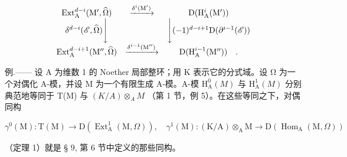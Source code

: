 \[
\begin{array}{c c c} \operatorname{Ext} _ {\mathrm{A}} ^ {d - i} (\mathrm{M} ^ {\prime}, \widehat {\Omega}) & \xrightarrow {\delta^ {i} (\mathrm{M} ^ {\prime})} & \mathrm{D} (\mathrm{H} _ {\mathrm{A}} ^ {i} (\mathrm{M} ^ {\prime})) \\ \delta^ {d - i} (\mathscr {E}, \widehat {\Omega}) \Bigg \downarrow & & \Bigg \downarrow (- 1) ^ {d - i + 1} \mathrm{D} (\partial^ {i - 1} (\mathscr {E})) \\ \operatorname{Ext} _ {\mathrm{A}} ^ {d - i + 1} (\mathrm{M} ^ {\prime \prime}, \widehat {\Omega}) & \xrightarrow {\delta^ {i - 1} (\mathrm{M} ^ {\prime \prime})} & \mathrm{D} (\mathrm{H} _ {\mathrm{A}} ^ {i - 1} (\mathrm{M} ^ {\prime \prime})) \quad . \end{array}
\]

例.—— 设 A 为维数 1 的 Noether 局部整环；用 K 表示它的分式域。设 Ω 为一个对偶化 A-模，并设 M 为一个有限生成 A-模。A-模 \(\mathrm{H}_{\mathrm{A}}^{0}(M)\) 与 \(\mathrm{H}_{\mathrm{A}}^{1}(M)\) 分别典范地等同于 T(M) 与 \((K/A) \otimes_{A} M\) （第 1 节，例 5）。在这些等同之下，对偶同构

\[
\gamma^ {0} (\mathrm{M}): \mathrm{T} (\mathrm{M}) \longrightarrow \mathrm{D} \left(\operatorname{Ext} _ {\mathrm{A}} ^ {1} (\mathrm{M}, \Omega)\right), \quad \gamma^ {1} (\mathrm{M}): (\mathrm{K} / \mathrm{A}) \otimes_ {\mathrm{A}} \mathrm{M} \longrightarrow \mathrm{D} \left(\operatorname{Hom} _ {\mathrm{A}} (\mathrm{M}, \Omega)\right)
\]

（定理 1）就是 § 9, 第 6 节中定义的那些同构。

